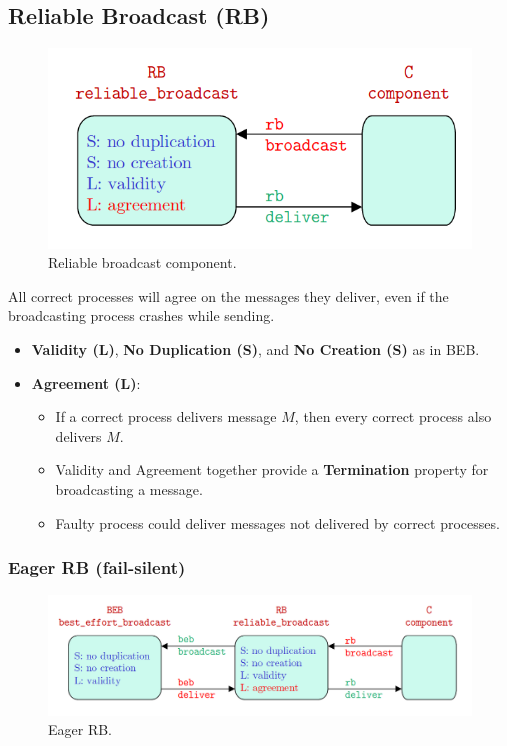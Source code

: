 \documentclass[11pt]{article}
\begin{document}
\subsection{Reliable Broadcast (RB)}
\begin{figure}[htb!]
  \centering
  \caption{Reliable broadcast component.}
  \includegraphics[scale=0.3]{rb}
\end{figure}
All correct processes will agree on the messages they deliver, even if the broadcasting process crashes while sending.

\begin{itemize}
  \item \textbf{Validity (L)}, \textbf{No Duplication (S)}, and \textbf{No Creation (S)} as in BEB.
  \item \textbf{Agreement (L)}:
    \begin{itemize}
      \item If a correct process delivers message $M$, then every correct process also delivers $M$.
      \item Validity and Agreement together provide a \textbf{Termination} property for broadcasting a message.
      \item Faulty process could deliver messages not delivered by correct processes.
    \end{itemize}
\end{itemize}

\subsubsection{Eager RB (fail-silent)}
\begin{figure}[htb!]
  \centering
  \caption{Eager RB.}
  \includegraphics[scale=0.3]{rbbeb}
\end{figure}
\end{document}
